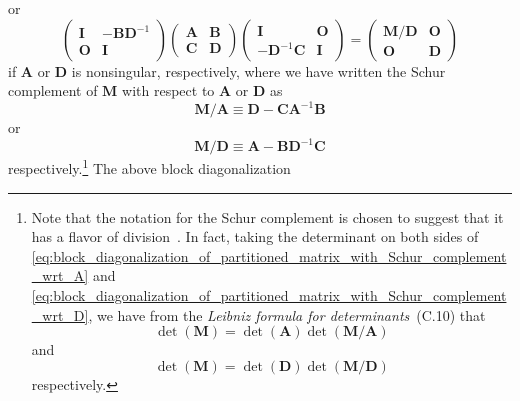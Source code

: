 \documentclass[12pt,a4paper]{article}
\begin{document}
or
\begin{equation}
\begin{pmatrix}
\mathbf{I} & -\mathbf{B}\mathbf{D}^{-1} \\
\mathbf{O} & \mathbf{I}
\end{pmatrix}
\begin{pmatrix}
\mathbf{A} & \mathbf{B} \\
\mathbf{C} & \mathbf{D}
\end{pmatrix}
\begin{pmatrix}
\mathbf{I} & \mathbf{O} \\
-\mathbf{D}^{-1}\mathbf{C} & \mathbf{I}
\end{pmatrix}
=
\begin{pmatrix}
\mathbf{M}/\mathbf{D} & \mathbf{O} \\
\mathbf{O} & \mathbf{D}
\end{pmatrix}
\label{eq:block_diagonalization_of_partitioned_matrix_with_Schur_complement_wrt_D}
\end{equation}
if $\mathbf{A}$ or $\mathbf{D}$ is nonsingular, respectively,
where we have written the Schur complement of $\mathbf{M}$ with respect to
$\mathbf{A}$ or $\mathbf{D}$ as
\begin{equation}
\mathbf{M}/\mathbf{A} \equiv \mathbf{D} - \mathbf{C}\mathbf{A}^{-1}\mathbf{B}
\label{eq:Schur_complement_of_M_wrt_A}
\end{equation}
or
\begin{equation}
\mathbf{M}/\mathbf{D} \equiv \mathbf{A} - \mathbf{B}\mathbf{D}^{-1}\mathbf{C}
\label{eq:Schur_complement_of_M_wrt_D}
\end{equation}
respectively.\footnote{%
Note that the notation for the Schur complement is chosen to suggest that
it has a flavor of division~\citep{Minka:OldNewMatrixAlgebra}.
In fact, taking the determinant on both sides of
\eqref{eq:block_diagonalization_of_partitioned_matrix_with_Schur_complement_wrt_A} and
\eqref{eq:block_diagonalization_of_partitioned_matrix_with_Schur_complement_wrt_D},
we have from the \emph{Leibniz formula for determinants}~(C.10) that
\begin{equation}
\operatorname{det}(\mathbf{M}) =
\operatorname{det}(\mathbf{A}) \operatorname{det}(\mathbf{M}/\mathbf{A})
\end{equation}
and
\begin{equation}
\operatorname{det}(\mathbf{M}) =
\operatorname{det}(\mathbf{D}) \operatorname{det}(\mathbf{M}/\mathbf{D})
\end{equation}
respectively.}
The above block diagonalization
\end{document}
